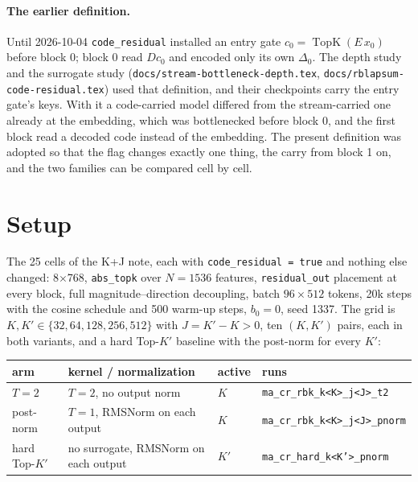 \documentclass[11pt,a4paper]{article}
\newcommand{\code}[1]{\texttt{#1}}
\newcommand{\Kp}{K'}
\newcommand{\TopK}{\operatorname{TopK}}
\begin{document}
\paragraph{The earlier definition.}
Until 2026-10-04 \code{code\_residual} installed an entry gate
$c_0 = \TopK(E\, x_0)$ before block 0; block 0 read $D c_0$ and encoded only
its own $\Delta_0$. The depth study and the surrogate study
(\code{docs/stream-bottleneck-depth.tex}, \code{docs/rblapsum-code-residual.tex})
used that definition, and their checkpoints carry the entry gate's keys.
With it a code-carried model differed from the stream-carried one already at
the embedding, which was bottlenecked before block 0, and the first block
read a decoded code instead of the embedding. The present definition was
adopted so that the flag changes exactly one thing, the carry from block 1
on, and the two families can be compared cell by cell.

\section{Setup}

The 25 cells of the K+J note, each with \code{code\_residual = true} and
nothing else changed: 8$\times$768, \code{abs\_topk} over $N = 1536$ features,
\code{residual\_out} placement at every block, full magnitude--direction
decoupling, batch $96 \times 512$ tokens, 20k steps with the cosine schedule
and 500 warm-up steps, $b_0 = 0$, seed 1337. The grid is
$K, \Kp \in \{32, 64, 128, 256, 512\}$ with $J = \Kp - K > 0$, ten $(K, \Kp)$
pairs, each in both variants, and a hard Top-$\Kp$ baseline with the
post-norm for every $\Kp$:

\begin{center}\footnotesize
\begin{tabular}{llll}
\toprule
arm & kernel / normalization & active & runs \\
\midrule
$T=2$          & $T=2$, no output norm                  & $K$   & \code{ma\_cr\_rbk\_k<K>\_j<J>\_t2} \\
post-norm      & $T=1$, RMSNorm on each output          & $K$   & \code{ma\_cr\_rbk\_k<K>\_j<J>\_pnorm} \\
hard Top-$\Kp$ & no surrogate, RMSNorm on each output   & $\Kp$ & \code{ma\_cr\_hard\_k<K'>\_pnorm} \\
\bottomrule
\end{tabular}
\end{center}
\end{document}
